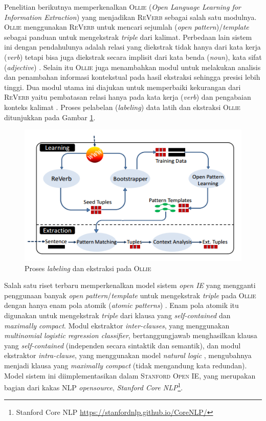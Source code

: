 Penelitian berikutnya memperkenalkan \textsc{Ollie} (\textit{Open Language Learning for Information Extraction}) \citep{schmitz2012open} yang menjadikan \textsc{ReVerb} sebagai salah satu modulnya. \textsc{Ollie} menggunakan \textsc{ReVerb} untuk mencari sejumlah (\textit{open pattern})/\textit{template} sebagai panduan untuk mengekstrak \textit{triple} dari kalimat. Perbedaan lain sistem ini dengan pendahulunya adalah relasi yang diekstrak tidak hanya dari kata kerja (\textit{verb}) tetapi bisa juga diekstrak secara implisit dari kata benda (\textit{noun}), kata sifat (\textit{adjective}) \citep{schmitz2012open}. Selain itu \textsc{Ollie} juga menambahkan modul untuk melakukan analisis dan penambahan informasi kontekstual pada hasil ekstraksi sehingga presisi lebih tinggi. Dua modul utama ini diajukan untuk memperbaiki kekurangan dari \textsc{ReVerb} yaitu pembatasan relasi hanya pada kata kerja (\textit{verb}) dan pengabaian konteks kalimat \citep{schmitz2012open}. Proses pelabelan (\textit{labeling}) data latih dan ekstraksi \textsc{Ollie} ditunjukkan pada Gambar \ref{fig:ollie_architecture}.

\begin{figure}
\centering
\includegraphics[scale=0.5]{../images/ollie_architecture.png}
\caption{Proses \textit{labeling} dan ekstraksi pada \textsc{Ollie}}
\label{fig:ollie_architecture}
\end{figure}

Salah satu riset terbaru memperkenalkan model sistem \textit{open IE} yang mengganti penggunaan banyak \textit{open pattern}/\textit{template} untuk mengekstrak \textit{triple} pada \textsc{Ollie} \citep{schmitz2012open} dengan hanya enam pola atomik (\textit{atomic patterns}) \citep{angeli2015leveraging}. Enam pola atomik itu digunakan untuk mengekstrak \textit{triple} dari klausa yang \textit{self-contained} dan \textit{maximally compact}. Modul ekstraktor \textit{inter-clauses}, yang menggunakan \textit{multinomial logistic regression classifier}, bertanggungjawab menghasilkan klausa yang \textit{self-contained} (independen secara sintaktik dan semantik), dan modul ekstraktor \textit{intra-clause}, yang menggunakan model \textit{natural logic} \citep{maccartney2007natural}, mengubahnya menjadi klausa yang \textit{maximally compact} (tidak mengandung kata redundan). Model sistem ini diimplementasikan dalam \textsc{Stanford Open IE}, yang merupakan bagian dari kakas NLP \textit{opensource}, \textit{Stanford Core NLP}\footnote{Stanford Core NLP \url{https://stanfordnlp.github.io/CoreNLP/}}.


